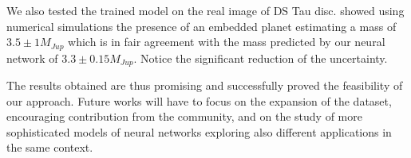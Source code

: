 \documentclass[a4paper,10pt, margin=1cm]{article}
\begin{document}
We also tested the trained model on the real image of DS Tau disc. \cite{dstauv} showed using numerical simulations
the presence of an embedded planet estimating a mass of $3.5\pm1M_{Jup}$ which is in fair agreement with the mass predicted by our neural network of $3.3\pm0.15M_{Jup}$.
Notice the significant reduction of the uncertainty.

The results obtained are thus promising and successfully proved the feasibility 
of our approach. 
Future works will have to focus on the expansion of the dataset, encouraging contribution from the community,
and on the study of more sophisticated models 
of neural networks exploring also different applications in the same context. 


\end{document}
